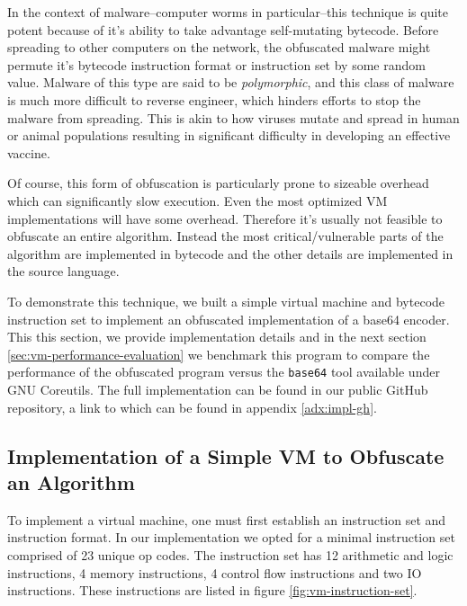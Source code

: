 \documentclass[conference]{IEEEtran}
\begin{document}
In the context of malware--computer worms in particular--this technique is quite potent because of it's ability to take advantage self-mutating bytecode. Before spreading to other computers on the network, the obfuscated malware might permute it's bytecode instruction format or instruction set by some random value. Malware of this type are said to be \textit{polymorphic}, and this class of malware is much more difficult to reverse engineer, which hinders efforts to stop the malware from spreading. This is akin to how viruses mutate and spread in human or animal populations resulting in significant difficulty in developing an effective vaccine.

Of course, this form of obfuscation is particularly prone to sizeable overhead which can significantly slow execution. Even the most optimized VM implementations will have some overhead. Therefore it's usually not feasible to obfuscate an entire algorithm. Instead the most critical/vulnerable parts of the algorithm are implemented in bytecode and the other details are implemented in the source language.

To demonstrate this technique, we built a simple virtual machine and bytecode instruction set to implement an obfuscated implementation of a base64 encoder. This this section, we provide implementation details and in the next section \ref{sec:vm-performance-evaluation} we benchmark this program to compare the performance of the obfuscated program versus the \texttt{base64} tool available under GNU Coreutils. The full implementation can be found in our public GitHub repository, a link to which can be found in appendix \ref{adx:impl-gh}.

\subsection{Implementation of a Simple VM to Obfuscate an Algorithm}
To implement a virtual machine, one must first establish an instruction set and instruction format. In our implementation we opted for a minimal instruction set comprised of 23 unique op codes. The instruction set has 12 arithmetic and logic instructions, 4 memory instructions, 4 control flow instructions and two IO instructions. These instructions are listed in figure \ref{fig:vm-instruction-set}.
\end{document}
